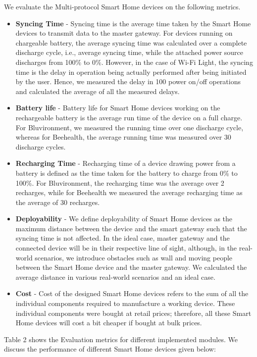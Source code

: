We evaluate the Multi-protocol Smart Home devices on the following metrics.
\begin{itemize}
\item \textbf{Syncing Time} - Syncing time is the average time taken by the Smart Home devices to transmit data to the master gateway. For devices running on chargeable battery, the average syncing time was calculated over a complete discharge cycle, i.e., average syncing time, while the attached power source discharges from 100\% to 0\%. However, in the case of Wi-Fi Light, the syncing time is the delay in operation being actually performed after being initiated by the user. Hence, we measured the delay in 100 power on/off operations and calculated the average of all the measured delays.
\item \textbf{Battery life} - Battery life for Smart Home devices working on the rechargeable battery is the average run time of the device on a full charge. For Bluvironment, we measured the running time over one discharge cycle, whereas for Beehealth, the average running time was measured over 30 discharge cycles.
\item \textbf{Recharging Time} - Recharging time of a device drawing power from a battery is defined as the time taken for the battery to charge from 0\% to 100\%. For Bluvironment, the recharging time was the average over 2 recharges, while for Beehealth we measured the average recharging time as the average of 30 recharges.
\item \textbf{Deployability} - We define deployability of Smart Home devices as the maximum distance between the device and the smart gateway such that the syncing time is not affected. In the ideal case, master gateway and the connected device will be in their respective line of sight, although, in the real-world scenarios, we introduce obstacles such as wall and moving people between the Smart Home device and the master gateway. We calculated the average distance in various real-world scenarios and an ideal case.
\item \textbf{Cost} - Cost of the designed Smart Home devices refers to the sum of all the individual components required to manufacture a working device. These individual components were bought at retail prices; therefore, all these Smart Home devices will cost a bit cheaper if bought at bulk prices.

\end{itemize}

Table 2 shows the Evaluation metrics for different implemented modules. We discuss the performance of different Smart Home devices given below:

